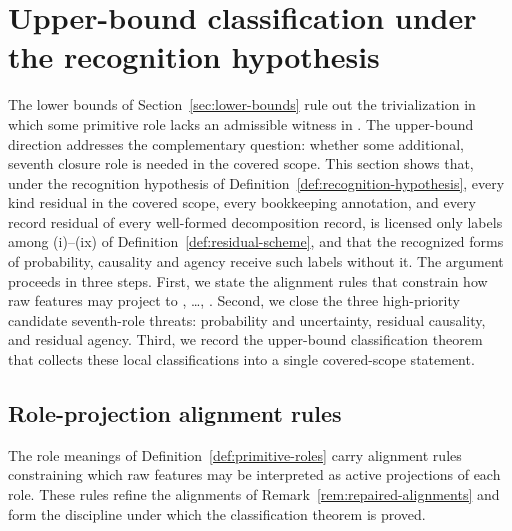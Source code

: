 \section{Upper-bound classification under the recognition hypothesis}\label{sec:upper-bound-classification}



The lower bounds of Section~\ref{sec:lower-bounds} rule out the
trivialization in which some primitive role lacks an admissible
witness in \FATCD{}. The upper-bound direction addresses the
complementary question: whether some additional, seventh closure role
is needed in the covered scope. This section shows that, under the
recognition hypothesis of Definition~\ref{def:recognition-hypothesis}, every
kind residual in the covered scope, every bookkeeping annotation, and every record residual of every
well-formed decomposition record, is licensed only labels among (i)--(ix) of
Definition~\ref{def:residual-scheme}, and that the recognized forms of
probability, causality and agency receive such labels without it. The argument proceeds in three steps. First, we state the
alignment rules that constrain how raw features may project to
\Pone{}, \ldots, \Psix{}. Second, we close the three high-priority
candidate seventh-role threats: probability and uncertainty, residual
causality, and residual agency. Third, we record the upper-bound
classification theorem that collects these local classifications into
a single covered-scope statement.

\subsection{Role-projection alignment rules}\label{subsec:alignment-rules}

The role meanings of Definition~\ref{def:primitive-roles} carry
alignment rules constraining which raw features may be interpreted as
active projections of each role. These rules refine the
alignments of Remark~\ref{rem:repaired-alignments} and form the
discipline under which the classification theorem is proved.

